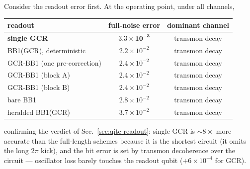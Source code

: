 \documentclass[11pt]{article}
\begin{document}
Consider the readout error first. At the operating point, under all channels,
\begin{center}
\begin{tabular}{lcc}
\toprule
readout & full-noise error & dominant channel\\
\midrule
\textbf{single GCR} & $\boldsymbol{3.3\times10^{-3}}$ & transmon decay\\
BB1(GCR), deterministic & $2.2\times10^{-2}$ & transmon decay\\
GCR-BB1 (one pre-correction) & $2.4\times10^{-2}$ & transmon decay\\
GCR-BB1 (block A) & $2.4\times10^{-2}$ & transmon decay\\
GCR-BB1 (block B) & $2.4\times10^{-2}$ & transmon decay\\
bare BB1 & $2.8\times10^{-2}$ & transmon decay\\
heralded BB1(GCR) & $3.7\times10^{-2}$ & transmon decay\\
\bottomrule
\end{tabular}
\end{center}
confirming the verdict of Sec.~\ref{sec:qite-readout}: single GCR is $\sim\!8\times$ more accurate than
the full-length schemes because it is the shortest circuit (it omits the long $2\pi$ kick), and the bit
error is set by transmon decoherence over the circuit --- oscillator loss barely touches the readout
qubit ($+6\times10^{-4}$ for GCR).
\end{document}

